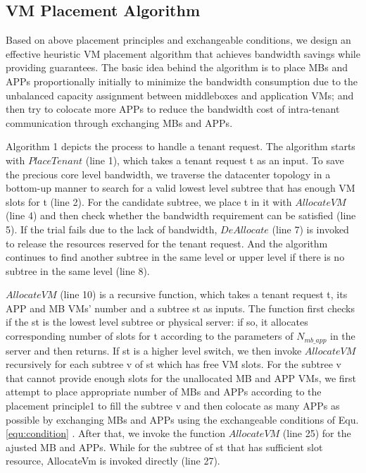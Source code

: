 \documentclass[review]{elsarticle}
\begin{document}
\subsection{VM Placement Algorithm}

Based on above placement principles and exchangeable conditions, we design an effective heuristic VM placement algorithm that achieves bandwidth savings while providing guarantees. The basic idea behind the algorithm is to place MBs and APPs proportionally initially to minimize the bandwidth consumption due to the unbalanced capacity assignment between middleboxes and application VMs; and then try to colocate more APPs to reduce the bandwidth cost of intra-tenant communication through exchanging MBs and APPs. 

Algorithm 1 depicts the process to handle a tenant request. The algorithm starts with $PlaceTenant$ (line 1), which takes a tenant request t as an input. To save the precious core level bandwidth, we traverse the datacenter topology in a bottom-up manner to search for a valid lowest level subtree that has enough VM slots for t (line 2). For the candidate subtree, we place t in it with $AllocateVM$ (line 4) and then check whether the bandwidth requirement can be satisfied (line 5). If the trial fails due to the lack of bandwidth, $DeAllocate$ (line 7) is invoked to release the resources reserved for the tenant request. And the algorithm continues to find another subtree in the same level or upper level if there is no subtree in the same level (line 8). 


 $AllocateVM$ (line 10) is a recursive function, which takes a tenant request t, its APP and MB VMs’ number and a subtree st as inputs. The function first checks if the st is the lowest level subtree or physical server: if so, it allocates corresponding number of slots for t according to the parameters of $N_{mb\_app}$ in the server and then returns. If st is a higher level switch, we then invoke $AllocateVM$ recursively for each subtree v of st which has free VM slots. For the subtree v that cannot provide enough slots for the unallocated MB and APP VMs, we first attempt to place appropriate number of MBs and APPs according to the placement principle1 to fill the subtree v and then colocate as many APPs as possible by exchanging MBs and APPs using the exchangeable conditions of Equ. \ref{equ:condition} . After that, we invoke the function $AllocateVM$ (line 25) for the ajusted MB and APPs. While for the subtree of st that has sufficient slot resource, AllocateVm is invoked directly (line 27). 
\end{document}
